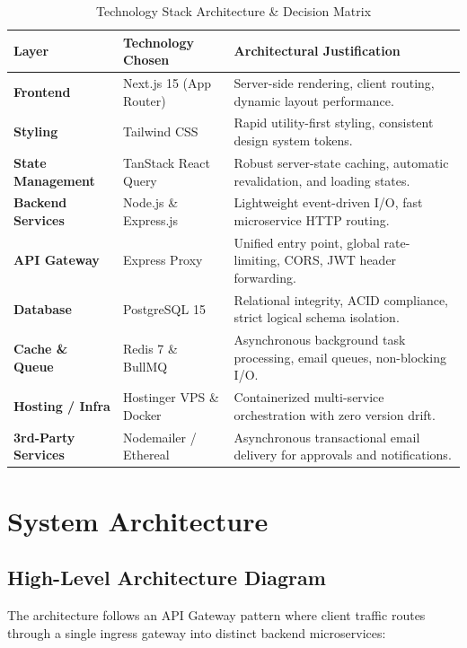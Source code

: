 \documentclass[12pt, a4paper]{article}
\begin{document}
\begin{table}[h!]
\centering
\caption{Technology Stack Architecture \& Decision Matrix}
\renewcommand{\arraystretch}{1.3}
\begin{tabular}{@{}lll@{}}
\toprule
\textbf{Layer} & \textbf{Technology Chosen} & \textbf{Architectural Justification} \\ \midrule
\textbf{Frontend} & Next.js 15 (App Router) & Server-side rendering, client routing, dynamic layout performance. \\
\textbf{Styling} & Tailwind CSS & Rapid utility-first styling, consistent design system tokens. \\
\textbf{State Management} & TanStack React Query & Robust server-state caching, automatic revalidation, and loading states. \\
\textbf{Backend Services} & Node.js \& Express.js & Lightweight event-driven I/O, fast microservice HTTP routing. \\
\textbf{API Gateway} & Express Proxy & Unified entry point, global rate-limiting, CORS, JWT header forwarding. \\
\textbf{Database} & PostgreSQL 15 & Relational integrity, ACID compliance, strict logical schema isolation. \\
\textbf{Cache \& Queue} & Redis 7 \& BullMQ & Asynchronous background task processing, email queues, non-blocking I/O. \\
\textbf{Hosting / Infra} & Hostinger VPS \& Docker & Containerized multi-service orchestration with zero version drift. \\
\textbf{3rd-Party Services} & Nodemailer / Ethereal & Asynchronous transactional email delivery for approvals and notifications. \\ \bottomrule
\end{tabular}
\end{table}

\section{System Architecture}

\subsection{High-Level Architecture Diagram}
The architecture follows an API Gateway pattern where client traffic routes through a single ingress gateway into distinct backend microservices:
\end{document}
